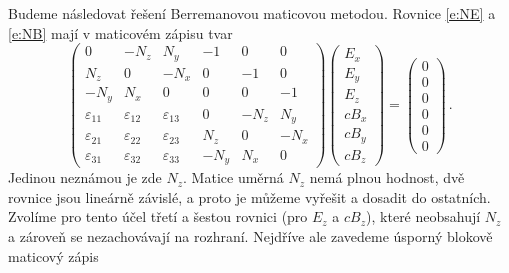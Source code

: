 Budeme následovat řešení Berremanovou maticovou metodou\cite{Berreman}.
Rovnice \eqref{e:NE} a \eqref{e:NB} mají v maticovém zápisu tvar
\begin{equation}
\begin{pmatrix}
0 & -N_z & N_y & -1 & 0 & 0 \\
N_z & 0 & -N_x & 0 & -1 & 0 \\
-N_y & N_x & 0 & 0 & 0 & -1 \\
\varepsilon_{11} & \varepsilon_{12} & \varepsilon_{13} & 0 & -N_z & N_y \\
\varepsilon_{21} & \varepsilon_{22} & \varepsilon_{23} & N_z & 0 & -N_x \\
\varepsilon_{31} & \varepsilon_{32} & \varepsilon_{33} & -N_y & N_x & 0
\end{pmatrix}
\begin{pmatrix}
E_x \\ E_y \\ E_z \\ cB_x \\ cB_y \\ cB_z
\end{pmatrix} = \begin{pmatrix}
0 \\ 0 \\ 0 \\ 0 \\ 0 \\ 0
\end{pmatrix} \,.
\end{equation}
Jedinou neznámou je zde $N_z$. Matice uměrná $N_z$ nemá plnou hodnost, dvě rovnice jsou lineárně závislé, a proto je můžeme vyřešit a dosadit do ostatních.
Zvolíme pro tento účel třetí a šestou rovnici (pro $E_z$ a $cB_z$), které neobsahují $N_z$ a zároveň se nezachovávají na rozhraní.
Nejdříve ale zavedeme úsporný blokově maticový zápis
